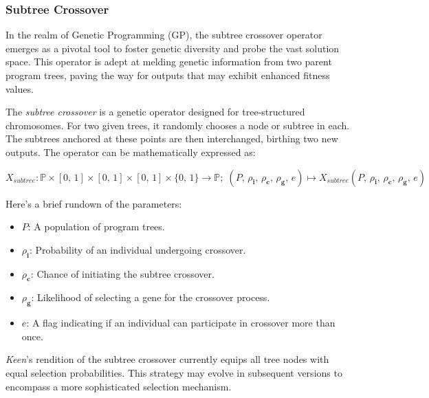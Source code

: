 \subsubsection{Subtree Crossover}
\label{sec:keen:gp:op:cx:subtree}
    In the realm of Genetic Programming (GP), the subtree crossover operator
    emerges as a pivotal tool to foster genetic diversity and probe the vast 
    solution space. This operator is adept at melding genetic information from 
    two parent program trees, paving the way for outputs that may exhibit 
    enhanced fitness values.

    \begin{definition}
        The \textit{subtree crossover} is a genetic operator designed for 
        tree-structured chromosomes. For two given trees, it randomly chooses a 
        node or subtree in each. The subtrees anchored at these points are then 
        interchanged, birthing two new outputs. The operator can be mathematically 
        expressed as:

        \begin{equation}
        X_{subtree}: \mathbb{P} \times [0,\, 1] \times [0,\, 1] \times [0,\, 1] \times \{0,\, 1\} \to \mathbb{P};\;
            (P,\, \rho_\mathbf{i},\, \rho_\mathbf{c},\, \rho_\mathbf{g},\, e) 
            \mapsto X_{subtree}(P,\, \rho_\mathbf{i},\, \rho_\mathbf{c},\, \rho_\mathbf{g},\, e)
        \end{equation}

        Here's a brief rundown of the parameters:

        \begin{itemize}
        \item \(P\): A population of program trees.
        \item \(\rho_\mathbf{i}\): Probability of an individual undergoing crossover.
        \item \(\rho_\mathbf{c}\): Chance of initiating the subtree crossover.
        \item \(\rho_\mathbf{g}\): Likelihood of selecting a gene for the crossover process.
        \item \(e\): A flag indicating if an individual can participate in crossover more than once.
        \end{itemize}
    \end{definition}

    \begin{remark}
        \textit{Keen}'s rendition of the subtree crossover currently equips all 
        tree nodes with equal selection probabilities. This strategy may evolve 
        in subsequent versions to encompass a more sophisticated selection 
        mechanism.
    \end{remark}

